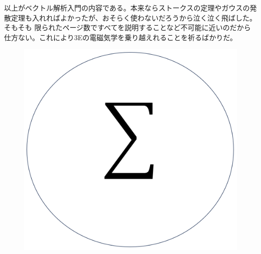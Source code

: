 \documentclass[a4j,dvipdfmx]{jsarticle}
\begin{document}
            以上がベクトル解析入門の内容である。本来ならストークスの定理やガウスの発散定理も入れればよかったが、おそらく使わないだろうから泣く泣く飛ばした。そもそも
            限られたページ数ですべてを説明することなど不可能に近いのだから仕方ない。これにより3Eの電磁気学を乗り越えれることを祈るばかりだ。
        
        \clearpage

        \thispagestyle{fancy}
        \fancyhead{}

        \begin{figure}
            \centering
            \includegraphics[scale=0.5]{img/QuuNote/icon.png}
        \end{figure}    

        
\end{document}
